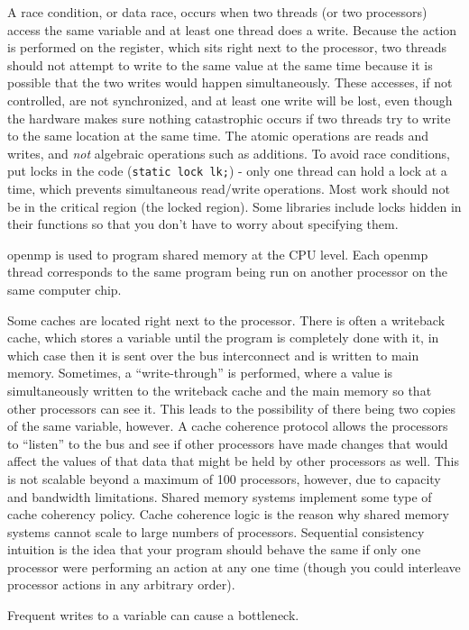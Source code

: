 \documentclass[10pt]{article}
\begin{document}
\begin{flushleft}
A race condition, or data race, occurs when two threads (or two processors) access the same variable and at least one thread does a write. Because the action is performed on the register, which sits right next to the processor, two threads should not attempt to write to the same value at the same time because it is possible that the two writes would happen simultaneously. These accesses, if not controlled, are not synchronized, and at least one write will be lost, even though the hardware makes sure nothing catastrophic occurs if two threads try to write to the same location at the same time. The atomic operations are reads and writes, and \textit{not} algebraic operations such as additions. To avoid race conditions, put locks in the code ({\tt static lock lk;}) - only one thread can hold a lock at a time, which prevents simultaneous read/write operations. Most work should not be in the critical region (the locked region). Some libraries include locks hidden in their functions so that you don't have to worry about specifying them.

\gls{openmp} is used to program shared memory at the CPU level. Each \gls{openmp} thread corresponds to the same program being run on another processor on the same computer chip.

Some caches are located right next to the processor. There is often a writeback cache, which stores a variable until the program is completely done with it, in which case then it is sent over the bus interconnect and is written to main memory. Sometimes, a ``write-through'' is performed, where a value is simultaneously written to the writeback cache and the main memory so that other processors can see it. This leads to the possibility of there being two copies of the same variable, however. A cache coherence protocol allows the processors to ``listen'' to the bus and see if other processors have made changes that would affect the values of that data that might be held by other processors as well. This is not scalable beyond a maximum of 100 processors, however, due to capacity and bandwidth limitations. Shared memory systems implement some type of cache coherency policy. Cache coherence logic is the reason why shared memory systems cannot scale to large numbers of processors. Sequential consistency intuition is the idea that your program should behave the same if only one processor were performing an action at any one time (though you could interleave processor actions in any arbitrary order). 

Frequent writes to a variable can cause a bottleneck. 


\end{flushleft}
\end{document}
